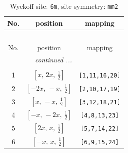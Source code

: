 \documentclass[fleqn,8pt]{jsarticle}
\begin{document}
\renewcommand{\arraystretch}{1.2}
\begin{longtable}{ccc}
\caption{Wyckoff site: {\tt 6m}, site symmetry: {\tt mm2}}
 \\
 \hline \hline
No. & position & mapping \\ \hline \endfirsthead

\multicolumn{2}{l}{\tablename\ \thetable{}} \\
 \hline \hline
No. & position & mapping \\ \hline \endhead

 \hline \hline
\multicolumn{2}{r}{\footnotesize\it continued ...} \\ \endfoot

 \hline \hline
\multicolumn{2}{r}{} \\ \endlastfoot

1 & $\left[ x,\, 2 x,\, \frac{1}{2} \right]$ & {\tt [1,11,16,20]} \\ \hline
2 & $\left[ - 2 x,\, - x,\, \frac{1}{2} \right]$ & {\tt [2,10,17,19]} \\ \hline
3 & $\left[ x,\, - x,\, \frac{1}{2} \right]$ & {\tt [3,12,18,21]} \\ \hline
4 & $\left[ - x,\, - 2 x,\, \frac{1}{2} \right]$ & {\tt [4,8,13,23]} \\ \hline
5 & $\left[ 2 x,\, x,\, \frac{1}{2} \right]$ & {\tt [5,7,14,22]} \\ \hline
6 & $\left[ - x,\, x,\, \frac{1}{2} \right]$ & {\tt [6,9,15,24]} \\
\end{longtable}
\renewcommand{\arraystretch}{1.2}
\end{document}
